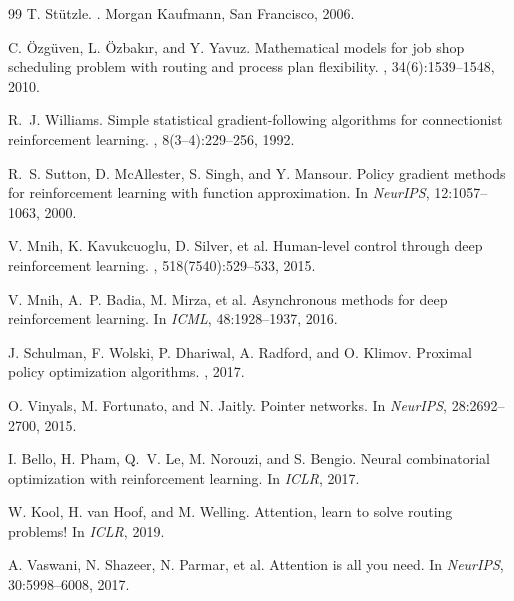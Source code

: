 \documentclass[10pt]{article}
\theoremstyle{definition}
\begin{document}
\begin{thebibliography}{99}
T. St\"utzle.
.
\newblock Morgan Kaufmann, San Francisco, 2006.

C. \"Ozg\"uven, L. \"Ozbak\i r, and Y. Yavuz.
\newblock Mathematical models for job shop scheduling
problem with routing and process plan flexibility.
,
34(6):1539--1548, 2010.

R.~J. Williams.
\newblock Simple statistical gradient-following algorithms
for connectionist reinforcement learning.
, 8(3--4):229--256, 1992.

R.~S. Sutton, D. McAllester, S. Singh, and Y. Mansour.
\newblock Policy gradient methods for reinforcement
learning with function approximation.
\newblock In {\em NeurIPS}, 12:1057--1063, 2000.

V. Mnih, K. Kavukcuoglu, D. Silver, et al.
\newblock Human-level control through deep reinforcement
learning.
, 518(7540):529--533, 2015.

V. Mnih, A.~P. Badia, M. Mirza, et al.
\newblock Asynchronous methods for deep reinforcement
learning.
\newblock In {\em ICML}, 48:1928--1937, 2016.

J. Schulman, F. Wolski, P. Dhariwal, A. Radford, and
O. Klimov.
\newblock Proximal policy optimization algorithms.
, 2017.

O. Vinyals, M. Fortunato, and N. Jaitly.
\newblock Pointer networks.
\newblock In {\em NeurIPS}, 28:2692--2700, 2015.

I. Bello, H. Pham, Q.~V. Le, M. Norouzi, and S. Bengio.
\newblock Neural combinatorial optimization with
reinforcement learning.
\newblock In {\em ICLR}, 2017.

W. Kool, H. van Hoof, and M. Welling.
\newblock Attention, learn to solve routing problems!
\newblock In {\em ICLR}, 2019.

A. Vaswani, N. Shazeer, N. Parmar, et al.
\newblock Attention is all you need.
\newblock In {\em NeurIPS}, 30:5998--6008, 2017.


\end{thebibliography}
\end{document}
